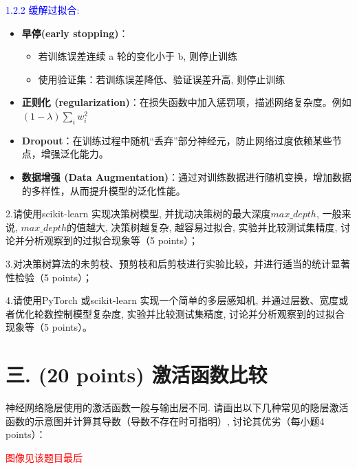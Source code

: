 \documentclass[8pt]{article}
\begin{document}
\textcolor{blue}{1.2.2 缓解过拟合:}
\begin{itemize}
    \item \textbf{早停(early stopping)}：
    \begin{itemize}
        \item 若训练误差连续 a 轮的变化小于 b, 则停止训练
        \item 使用验证集：若训练误差降低、验证误差升高, 则停止训练
    \end{itemize}
    \item \textbf{正则化 (regularization)}：在损失函数中加入惩罚项，描述网络复杂度。例如$(1-\lambda)\sum_{i}{w_i^2} $
    \item \textbf{Dropout}：在训练过程中随机“丢弃”部分神经元，防止网络过度依赖某些节点，增强泛化能力。
    \item \textbf{数据增强 (Data Augmentation)}：通过对训练数据进行随机变换，增加数据的多样性，从而提升模型的泛化性能。
\end{itemize}

2.请使用scikit-learn 实现决策树模型, 并扰动决策树的最大深度$max\_ depth$, 一般来说, $max\_ depth$的值越大, 决策树越复杂, 越容易过拟合, 实验并比较测试集精度, 讨论并分析观察到的过拟合现象等（5 points）；

3.对决策树算法的未剪枝、预剪枝和后剪枝进行实验比较，并进行适当的统计显著性检验（5 points）；

4.请使用PyTorch 或scikit-learn 实现一个简单的多层感知机, 并通过层数、宽度或者优化轮数控制模型复杂度, 实验并比较测试集精度, 讨论并分析观察到的过拟合现象等（5 points）。

\vspace{3em}

\section*{三. (20 points) 激活函数比较}
神经网络隐层使用的激活函数一般与输出层不同. 请画出以下几种常见的隐层激活函数的示意图并计算其导数（导数不存在时可指明）, 讨论其优劣（每小题4 points）：

\textcolor{red}{图像见该题目最后}
\end{document}

